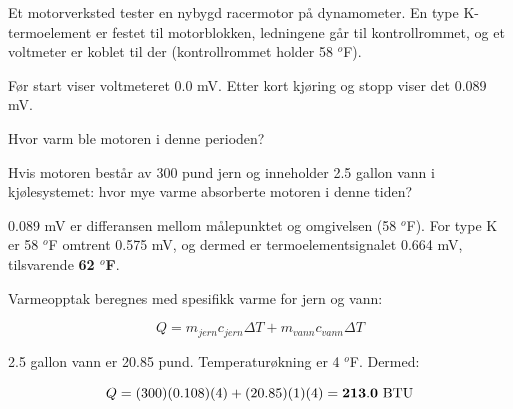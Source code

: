 

Et motorverksted tester en nybygd racermotor på dynamometer. En type K-termoelement er festet til motorblokken, ledningene går til kontrollrommet, og et voltmeter er koblet til der (kontrollrommet holder 58 $^{o}$F).

\vskip 10pt

Før start viser voltmeteret 0.0 mV. Etter kort kjøring og stopp viser det 0.089 mV.

\vskip 10pt

Hvor varm ble motoren i denne perioden?

\vskip 10pt

Hvis motoren består av 300 pund jern og inneholder 2.5 gallon vann i kjølesystemet: hvor mye varme absorberte motoren i denne tiden?







0.089 mV er differansen mellom målepunktet og omgivelsen (58 $^{o}$F). For type K er 58 $^{o}$F omtrent 0.575 mV, og dermed er termoelementsignalet 0.664 mV, tilsvarende {\bf 62 $^{o}$F}.

\vskip 10pt

Varmeopptak beregnes med spesifikk varme for jern og vann:

$$Q = m_{jern}c_{jern} \Delta T + m_{vann}c_{vann} \Delta T$$
 
2.5 gallon vann er 20.85 pund. Temperaturøkning er 4 $^{o}$F. Dermed:

$$Q = (300)(0.108)(4)+ (20.85)(1)(4) = {\bf 213.0 \hbox{ BTU}}$$










